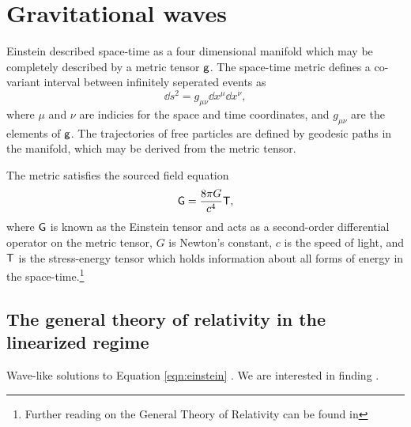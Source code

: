 \chapter{Gravitational waves}


Einstein described space-time as a four dimensional manifold which may be completely described by a metric tensor $\mathsf{g}$. %
The space-time metric defines a co-variant interval between infinitely seperated events as
\begin{equation}
\dd s^2 = g_{\mu \nu}\dd x^\mu \dd x^\nu,
\end{equation}
where $\mu$ and $\nu$ are indicies for the space and time coordinates, and $g_{\mu \nu}$ are the elements of $\mathsf{g}$. %
The trajectories of free particles are defined by geodesic paths in the manifold, which may be derived from the metric tensor.

The metric satisfies the sourced field equation
\begin{equation}
\label{eqn:einstein}
\mathsf{G}=\frac{8\pi G}{c^4}\mathsf{T},
\end{equation}
where $\mathsf{G}$ is known as the Einstein tensor and acts as a second-order differential operator on the metric tensor, $G$ is Newton's constant, $c$ is the speed of light, and $\mathsf{T}$ is the stress-energy tensor which holds information about all forms of energy in the space-time.\footnote{Further reading on the General Theory of Relativity can be found in }

\section{The general theory of relativity in the linearized regime}

Wave-like solutions to Equation \ref{eqn:einstein} . %
We are interested in finding .


